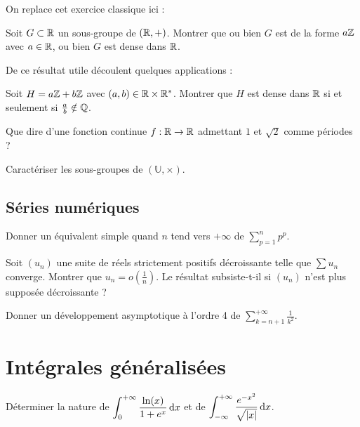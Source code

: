 \documentclass[12pt,a4paper]{exo_book}
\begin{document}
On replace cet exercice classique ici :

\begin{exo}
    Soit $G \subset \mathbb{R}$ un sous-groupe de $(\mathbb{R},+)$. Montrer que ou bien $G$ est de la forme $a\mathbb{Z}$ avec $a \in \mathbb{R}$, ou bien $G$ est dense dans $\mathbb{R}$.
\end{exo}

De ce résultat utile découlent quelques applications :

\begin{exo}
    Soit $H = a\mathbb{Z} + b\mathbb{Z}$ avec $(a,b) \in \mathbb{R}\times\mathbb{R}^*$. Montrer que $H$ est dense dans $\mathbb{R}$ si et seulement si $\frac{a}{b} \notin \mathbb{Q}$.
\end{exo}

\begin{exo}
    Que dire d'une fonction continue $f : \mathbb{R} \to \mathbb{R}$ admettant $1$ et $\sqrt{2}$ comme périodes ?
\end{exo}

\begin{exo}
    Caractériser les sous-groupes de $(\mathbb{U}, \times)$.
\end{exo}

\section{Séries numériques}

\begin{exo}
    Donner un équivalent simple quand $n$ tend vers $+\infty$ de $\sum_{p=1}^n p^p$.
\end{exo}

\begin{exo}
    Soit $(u_n)$ une suite de réels strictement positifs décroissante telle que $\sum u_n$ converge. Montrer que $u_n = o\left(\frac{1}{n}\right)$. Le résultat subsiste-t-il si $(u_n)$ n'est plus supposée décroissante ?
\end{exo}

\begin{exo}
    Donner un développement asymptotique à l'ordre 4 de $\displaystyle \sum_{k=n+1}^{+\infty} \frac{1}{k^2}$.
\end{exo}

\chapter{Intégrales généralisées}

\begin{exo}
    Déterminer la nature de $\displaystyle \int_0^{+\infty} \frac{\ln(x)}{1 + e^x} {\rm \, d} x$ et de $\displaystyle \int_{-\infty}^{+\infty} \frac{e^{-x^2}}{\sqrt{|x|}} {\rm \, d} x$.
\end{exo}
\end{document}
